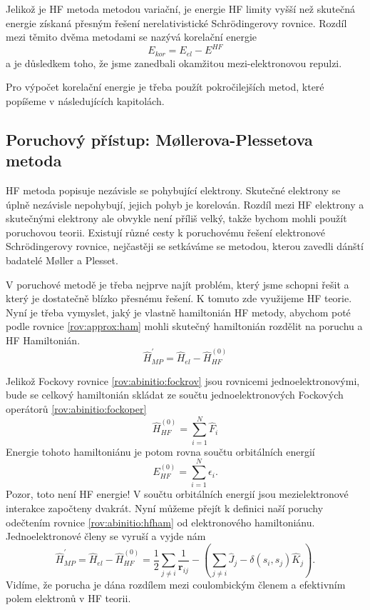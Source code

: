 Jelikož je HF metoda metodou variační, je energie HF limity vyšší než skutečná energie získaná přesným řešení nerelativistické Schr\"{o}dingerovy rovnice.
Rozdíl mezi těmito dvěma metodami se nazývá korelační energie
\begin{equation}
E_{kor}=E_{el} - E^{HF}
\end{equation}
a je důsledkem toho, že jsme zanedbali okamžitou mezi-elektronovou repulzi.



Pro výpočet korelační energie je třeba použít pokročilejších metod, které popíšeme v následujících kapitolách.

\subsection{Poruchový přístup: M\o llerova-Plessetova metoda}
HF metoda popisuje nezávisle se pohybující elektrony. Skutečné elektrony se úplně nezávisle nepohybují, jejich pohyb je korelován. Rozdíl mezi HF elektrony a skutečnými elektrony ale obvykle není příliš velký, takže bychom mohli použít poruchovou teorii.  Existují různé cesty k poruchovému řešení elektronové Schr\"{o}dingerovy rovnice, nejčastěji se setkáváme se metodou, kterou zavedli dánští badatelé M\o ller a Plesset.

V poruchové metodě je třeba nejprve najít problém, který jsme schopni řešit a který je dostatečně blízko přesnému řešení. K tomuto zde využijeme HF teorie. Nyní je třeba vymyslet, jaký je vlastně hamiltonián HF metody, abychom poté podle rovnice \ref{rov:approx:ham} mohli skutečný hamiltonián rozdělit na poruchu a HF Hamiltonián.
\begin{equation}
\hat{H}^{\prime}_{MP}=\hat{H}_{el} - \hat{H}^{(0)}_{HF}
\end{equation}

Jelikož Fockovy rovnice \ref{rov:abinitio:fockrov} jsou rovnicemi jednoelektronovými, bude se celkový hamiltonián skládat ze součtu jednoelektronových Fockových operátorů \ref{rov:abinitio:fockoper}
\begin{equation}
\hat{H}^{(0)}_{HF}= \sum_{i=1}^N \hat{F}_i
\label{rov:abinitio:hfham}
\end{equation}
Energie tohoto hamiltoniánu je potom rovna součtu orbitálních energií
\begin{equation}
E^{(0)}_{HF}=\sum_{i=1}^N \epsilon_i .
\end{equation}
Pozor, toto není HF energie! V součtu orbitálních energií jsou mezielektronové interakce započteny dvakrát. Nyní můžeme přejít k definici naší poruchy odečtením rovnice \eqref{rov:abinitio:hfham} od elektronového hamiltoniánu. Jednoelektronové členy se vyruší a vyjde nám
\begin{equation}
\hat{H}^{\prime}_{MP}=\hat{H}_{el}-\hat{H}^{(0)}_{HF}= \frac{1}{2}\sum_{j\neq i} \frac{1}{\textbf{r}_{ij}} - \left(\sum_{j\neq i} \hat{J}_j - \delta(s_i,s_j) \hat{K}_j \right) .
\end{equation}
Vidíme, že porucha je dána rozdílem mezi coulombickým členem a efektivním polem elektronů v HF teorii.

